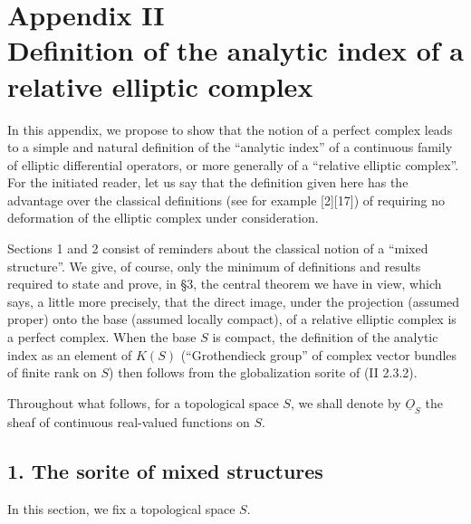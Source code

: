 %
\section*{Appendix II\\ Definition of the analytic index of a relative elliptic complex}

In this appendix, we propose to show that the notion of a perfect complex leads to a simple and natural definition of the \textquotedblleft analytic index\textquotedblright{} of a continuous family of elliptic differential operators, or more generally of a \textquotedblleft relative elliptic complex\textquotedblright. For the initiated reader, let us say that the definition given here has the advantage over the classical definitions (see for example [2][17]) of requiring no deformation of the elliptic complex under consideration.

Sections 1 and 2 consist of reminders about the classical notion of a \textquotedblleft mixed structure\textquotedblright{}. We give, of course, only the minimum of definitions and results required to state and prove, in \S3, the central theorem we have in view, which says, a little more precisely, that the direct image, under the projection (assumed proper) onto the base (assumed locally compact), of a relative elliptic complex is a perfect complex. When the base $S$ is compact, the definition of the analytic index as an element of $K(S)$ (\textquotedblleft Grothendieck group\textquotedblright{} of complex vector bundles of finite rank on $S$) then follows from the globalization sorite of (II 2.3.2).

Throughout what follows, for a topological space $S$, we shall denote by $\underline{O}_S$ the sheaf of continuous real-valued functions on $S$.

\subsection*{1. The sorite of mixed structures}

In this section, we fix a topological space $S$.

